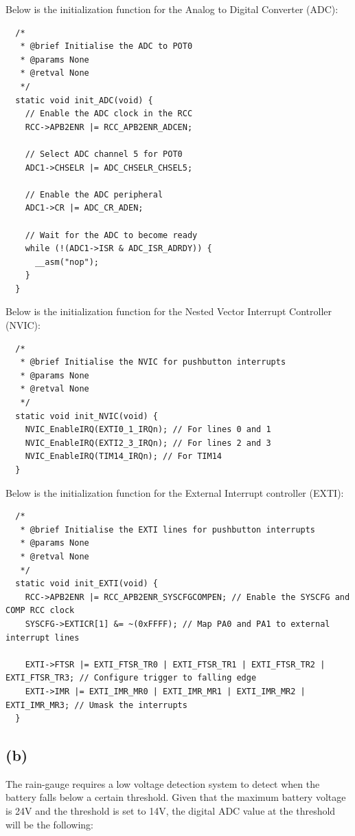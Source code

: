 Below is the initialization function for the Analog to Digital Converter (ADC):\\

\begin{verbatim}
  /*
   * @brief Initialise the ADC to POT0
   * @params None
   * @retval None
   */
  static void init_ADC(void) {
    // Enable the ADC clock in the RCC
    RCC->APB2ENR |= RCC_APB2ENR_ADCEN;

    // Select ADC channel 5 for POT0
    ADC1->CHSELR |= ADC_CHSELR_CHSEL5;

    // Enable the ADC peripheral
    ADC1->CR |= ADC_CR_ADEN;

    // Wait for the ADC to become ready
    while (!(ADC1->ISR & ADC_ISR_ADRDY)) {
      __asm("nop");
    }
  }
\end{verbatim}
\vspace{0.5cm}

Below is the initialization function for the Nested Vector Interrupt Controller (NVIC):\\

\begin{verbatim}
  /*
   * @brief Initialise the NVIC for pushbutton interrupts
   * @params None
   * @retval None
   */
  static void init_NVIC(void) {
    NVIC_EnableIRQ(EXTI0_1_IRQn); // For lines 0 and 1
    NVIC_EnableIRQ(EXTI2_3_IRQn); // For lines 2 and 3
    NVIC_EnableIRQ(TIM14_IRQn); // For TIM14
  }
\end{verbatim}
\vspace{0.5cm}

Below is the initialization function for the External Interrupt controller (EXTI):\\

\begin{verbatim}
  /*
   * @brief Initialise the EXTI lines for pushbutton interrupts
   * @params None
   * @retval None
   */
  static void init_EXTI(void) {
    RCC->APB2ENR |= RCC_APB2ENR_SYSCFGCOMPEN; // Enable the SYSCFG and COMP RCC clock
    SYSCFG->EXTICR[1] &= ~(0xFFFF); // Map PA0 and PA1 to external interrupt lines

    EXTI->FTSR |= EXTI_FTSR_TR0 | EXTI_FTSR_TR1 | EXTI_FTSR_TR2 | EXTI_FTSR_TR3; // Configure trigger to falling edge
    EXTI->IMR |= EXTI_IMR_MR0 | EXTI_IMR_MR1 | EXTI_IMR_MR2 | EXTI_IMR_MR3; // Umask the interrupts
  }
\end{verbatim}
\vspace{0.5cm}

\subsection*{(b)}
\label{sub:(b)}
The rain-gauge requires a low voltage detection system to detect when the battery falls below a certain threshold. Given that the maximum battery voltage is 24V and the threshold is set to 14V, the digital ADC value at the threshold will be the following:

